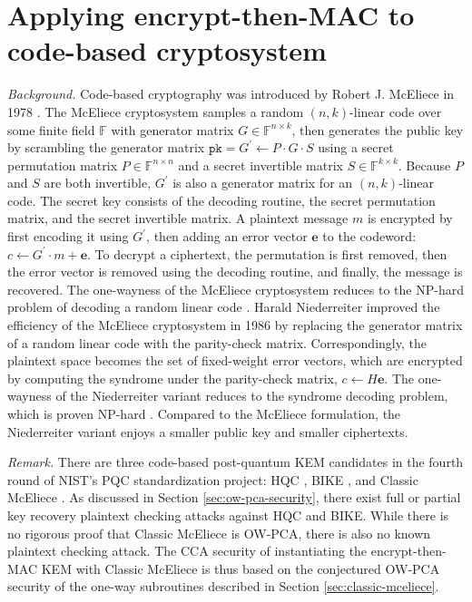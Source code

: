 \documentclass[runningheads]{llncs}
\newcommand{\pk}{\texttt{pk}}
\begin{document}
\section{Applying encrypt-then-MAC to code-based cryptosystem}\label{sec:application-to-mceliece}
{\it Background.} Code-based cryptography was introduced by Robert J. McEliece in 1978 \cite{McEliece1978}. The McEliece cryptosystem samples a random $(n, k)$-linear code over some finite field $\mathbb{F}$ with generator matrix $G \in \mathbb{F}^{n \times k}$, then generates the public key by scrambling the generator matrix $\pk = G^\prime \leftarrow P \cdot G \cdot S$ using a secret permutation matrix $P \in \mathbb{F}^{n \times n}$ and a secret invertible matrix $S\in\mathbb{F}^{k \times k}$. Because $P$ and $S$ are both invertible, $G^\prime$ is also a generator matrix for an $(n, k)$-linear code. The secret key consists of the decoding routine, the secret permutation matrix, and the secret invertible matrix. A plaintext message $m$ is encrypted by first encoding it using $G^\prime$, then adding an error vector $\mathbf{e}$ to the codeword: $c \leftarrow G^\prime\cdot m + \mathbf{e}$. To decrypt a ciphertext, the permutation is first removed, then the error vector is removed using the decoding routine, and finally, the message is recovered. The one-wayness of the McEliece cryptosystem reduces to the NP-hard problem of decoding a random linear code \cite{DBLP:journals/tit/BerlekampMT78}. Harald Niederreiter improved the efficiency of the McEliece cryptosystem in 1986 \cite{niederreiter1986knapsack} by replacing the generator matrix of a random linear code with the parity-check matrix. Correspondingly, the plaintext space becomes the set of fixed-weight error vectors, which are encrypted by computing the syndrome under the parity-check matrix, $c \leftarrow H\mathbf{e}$. The one-wayness of the Niederreiter variant reduces to the syndrome decoding problem, which is proven NP-hard \cite{DBLP:journals/tit/BerlekampMT78}. Compared to the McEliece formulation, the Niederreiter variant enjoys a smaller public key and smaller ciphertexts.

\textit{Remark.} There are three code-based post-quantum KEM candidates in the fourth round of NIST's PQC standardization project: HQC \cite{hamming-quasi-cyclic-4th-round-submission}, BIKE \cite{bike-4th-round-submission}, and Classic McEliece \cite{ClassicMcEliece2022}. As discussed in Section \ref{sec:ow-pca-security}, there exist full or partial key recovery plaintext checking attacks against HQC and BIKE. While there is no rigorous proof that Classic McEliece is OW-PCA, there is also no known plaintext checking attack. The CCA security of instantiating the encrypt-then-MAC KEM with Classic McEliece is thus based on the conjectured OW-PCA security of the one-way subroutines described in Section \ref{sec:classic-mceliece}.
\end{document}

